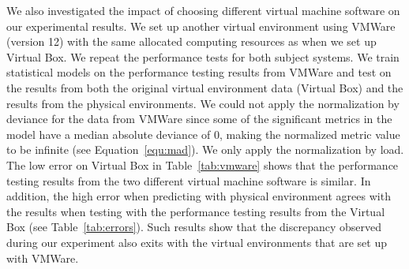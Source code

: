 We also investigated the impact of choosing different virtual machine software on our experimental results. We set up another virtual environment using VMWare (version 12) with the same allocated computing resources as when we set up Virtual Box. We repeat the performance tests for both subject systems. We train statistical models on the performance testing results from VMWare and test on the results from both the original virtual environment data (Virtual Box) and the results from the physical environments. We could not apply the normalization by deviance for the data from VMWare since some of the significant metrics in the model have a median absolute deviance of 0, making the normalized metric value to be infinite (see Equation~\ref{equ:mad}). We only apply the normalization by load. The low error on Virtual Box in Table~\ref{tab:vmware} shows that the performance testing results from the two different virtual machine software is similar. In addition, the high error when predicting with physical environment agrees with the results when testing with the performance testing results from the Virtual Box (see Table~\ref{tab:errors}). Such results show that the discrepancy  observed during our experiment also exits with the virtual environments that are set up with VMWare.



